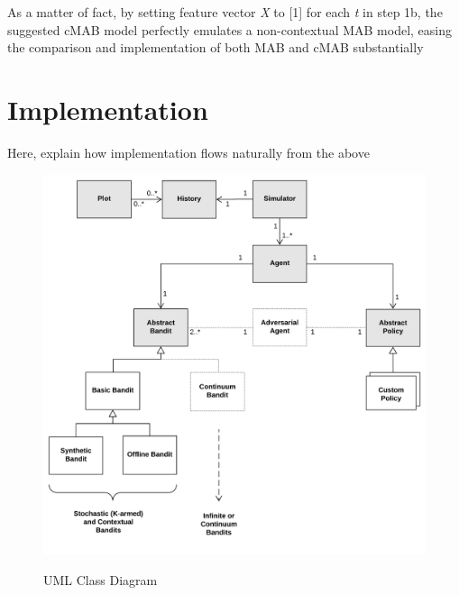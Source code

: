 \documentclass[nojss]{jss}\usepackage[]{graphicx}\usepackage[]{color}
\begin{document}
As a matter of fact, by setting feature vector \textit{X} to [1] for each \textit{t} in step 1b, the suggested cMAB model perfectly emulates a non-contextual MAB model, easing the comparison and implementation of both MAB and cMAB substantially

\section{Implementation}

Here, explain how implementation flows naturally from the above

\begin{figure}[H]
  \centering
    \includegraphics[width=.99\textwidth]{fig/contextual_class}
    \label{fig:contextual_class}
      \caption{ UML Class Diagram}
\end{figure}
\end{document}

